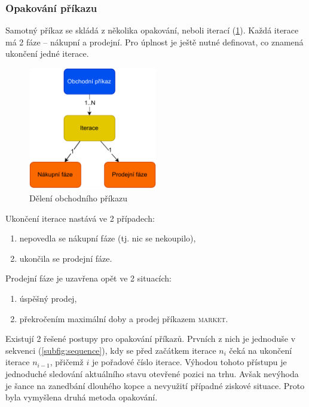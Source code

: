 \subsubsection{Opakování příkazu}
Samotný příkaz se skládá z několika opakování, neboli iterací (\ref{fig:trade-order-parts}). Každá iterace má 2 fáze -- nákupní a prodejní. Pro úplnost je ještě nutné definovat, co znamená ukončení jedné iterace.
\begin{figure}[ht]
    \centering
    \includegraphics[width=0.5\textwidth]{Figures/trade-order-parts.pdf}
    \caption{Dělení obchodního příkazu}
    \label{fig:trade-order-parts}
\end{figure}
Ukončení iterace nastává ve 2 případech:
\begin{enumerate}
    \item nepovedla se nákupní fáze (tj. nic se nekoupilo),
    \item ukončila se prodejní fáze.
\end{enumerate}
Prodejní fáze je uzavřena opět ve 2 situacích:
\begin{enumerate}
    \item úspěšný prodej,
    \item překročením maximální doby a prodej příkazem \textsc{market}.
\end{enumerate}

Existují 2 řešené postupy pro opakování příkazů. Prvních z nich je jednoduše v sekvenci (\ref{subfig:sequence}), kdy se před začátkem iterace $n_i$ čeká na ukončení iterace $n_{i - 1}$, přičemž $i$ je pořadové
číslo iterace. Výhodou tohoto přístupu je jednoduché sledování aktuálního stavu otevřené pozici na trhu. Avšak nevýhoda je šance na zanedbání dlouhého kopce a nevyužití případné ziskové situace.
Proto byla vymyšlena druhá metoda opakování.

